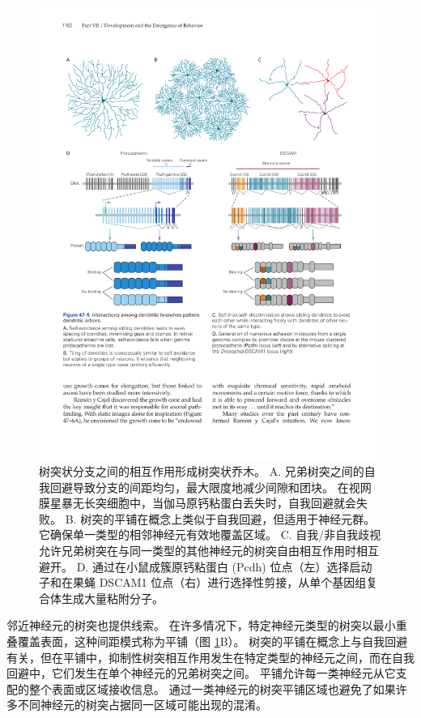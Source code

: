 \begin{figure}[htbp]
	\centering
	\includegraphics[width=0.95\linewidth]{chap47/fig_47_5}
	\caption{树突状分支之间的相互作用形成树突状乔木。 A. 兄弟树突之间的自我回避导致分支的间距均匀，最大限度地减少间隙和团块。 在视网膜星暴无长突细胞中，当伽马原钙粘蛋白丢失时，自我回避就会失败。 B. 树突的平铺在概念上类似于自我回避，但适用于神经元群。 它确保单一类型的相邻神经元有效地覆盖区域。 C. 自我/非自我歧视允许兄弟树突在与同一类型的其他神经元的树突自由相互作用时相互避开。 D. 通过在小鼠成簇原钙粘蛋白 (Pcdh) 位点（左）选择启动子和在果蝇 DSCAM1 位点（右）进行选择性剪接，从单个基因组复合体生成大量粘附分子。}
	\label{fig:47_5}
\end{figure}

邻近神经元的树突也提供线索。 在许多情况下，特定神经元类型的树突以最小重叠覆盖表面，这种间距模式称为平铺（图 \ref{fig:47_5}B）。 树突的平铺在概念上与自我回避有关，但在平铺中，抑制性树突相互作用发生在特定类型的神经元之间，而在自我回避中，它们发生在单个神经元的兄弟树突之间。 平铺允许每一类神经元从它支配的整个表面或区域接收信息。 通过一类神经元的树突平铺区域也避免了如果许多不同神经元的树突占据同一区域可能出现的混淆。

